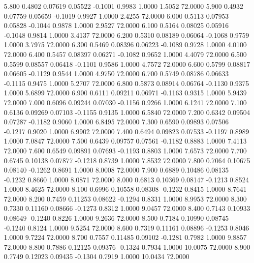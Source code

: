    5.800   0.4802   0.07619   0.05522  -0.1001   0.9983   1.0000   1.5052  72.0000
   5.900   0.4932   0.07759   0.05659  -0.1019   0.9927   1.0000   2.4255  72.0000
   6.000   0.5113   0.07953   0.05828  -0.1044   0.9878   1.0000   2.9527  72.0000
   6.100   0.5164   0.08025   0.05916  -0.1048   0.9814   1.0000   3.4137  72.0000
   6.200   0.5310   0.08189   0.06064  -0.1068   0.9759   1.0000   3.7975  72.0000
   6.300   0.5469   0.08396   0.06223  -0.1089   0.9728   1.0000   4.0100  72.0000
   6.400   0.5457   0.08397   0.06271  -0.1082   0.9652   1.0000   4.4079  72.0000
   6.500   0.5599   0.08557   0.06418  -0.1101   0.9586   1.0000   4.7572  72.0000
   6.600   0.5799   0.08817   0.06605  -0.1129   0.9544   1.0000   4.9750  72.0000
   6.700   0.5749   0.08786   0.06633  -0.1115   0.9475   1.0000   5.2707  72.0000
   6.800   0.5873   0.08914   0.06764  -0.1130   0.9375   1.0000   5.6899  72.0000
   6.900   0.6111   0.09211   0.06971  -0.1163   0.9315   1.0000   5.9439  72.0000
   7.000   0.6096   0.09244   0.07030  -0.1156   0.9266   1.0000   6.1241  72.0000
   7.100   0.6136   0.09269   0.07103  -0.1155   0.9135   1.0000   6.5840  72.0000
   7.200   0.6342   0.09504   0.07287  -0.1182   0.9060   1.0000   6.8495  72.0000
   7.300   0.6590   0.09893   0.07506  -0.1217   0.9020   1.0000   6.9902  72.0000
   7.400   0.6494   0.09823   0.07533  -0.1197   0.8989   1.0000   7.0847  72.0000
   7.500   0.6439   0.09757   0.07561  -0.1182   0.8883   1.0000   7.4113  72.0000
   7.600   0.6549   0.09891   0.07693  -0.1193   0.8803   1.0000   7.6573  72.0000
   7.700   0.6745   0.10138   0.07877  -0.1218   0.8739   1.0000   7.8532  72.0000
   7.800   0.7064   0.10675   0.08140  -0.1262   0.8691   1.0000   8.0008  72.0000
   7.900   0.6889   0.10486   0.08135  -0.1232   0.8660   1.0000   8.0871  72.0000
   8.000   0.6813   0.10369   0.08147  -0.1213   0.8524   1.0000   8.4625  72.0000
   8.100   0.6996   0.10558   0.08308  -0.1232   0.8415   1.0000   8.7641  72.0000
   8.200   0.7459   0.11253   0.08622  -0.1294   0.8331   1.0000   8.9953  72.0000
   8.300   0.7330   0.11160   0.08666  -0.1273   0.8312   1.0000   9.0457  72.0000
   8.400   0.7143   0.10933   0.08649  -0.1240   0.8226   1.0000   9.2636  72.0000
   8.500   0.7184   0.10990   0.08745  -0.1240   0.8124   1.0000   9.5254  72.0000
   8.600   0.7319   0.11161   0.08896  -0.1253   0.8046   1.0000   9.7224  72.0000
   8.700   0.7557   0.11485   0.09102  -0.1281   0.7982   1.0000   9.8857  72.0000
   8.800   0.7886   0.12125   0.09376  -0.1324   0.7934   1.0000  10.0075  72.0000
   8.900   0.7749   0.12023   0.09435  -0.1304   0.7919   1.0000  10.0434  72.0000
